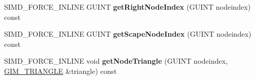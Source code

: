 \begin{DoxyCompactItemize}
\item 
\mbox{\label{classGIM__BOX__TREE__TEMPLATE__SET_ab5c3454c5dd0c971905f9d42ae26cb4b}} 
S\+I\+M\+D\+\_\+\+F\+O\+R\+C\+E\+\_\+\+I\+N\+L\+I\+NE G\+U\+I\+NT {\bfseries get\+Right\+Node\+Index} (G\+U\+I\+NT nodeindex) const
\item 
\mbox{\label{classGIM__BOX__TREE__TEMPLATE__SET_a9f71becbc8d9186689c5bc00293cafbc}} 
S\+I\+M\+D\+\_\+\+F\+O\+R\+C\+E\+\_\+\+I\+N\+L\+I\+NE G\+U\+I\+NT {\bfseries get\+Scape\+Node\+Index} (G\+U\+I\+NT nodeindex) const
\item 
\mbox{\label{classGIM__BOX__TREE__TEMPLATE__SET_a304de6f2f02351f2b361099ec1880827}} 
S\+I\+M\+D\+\_\+\+F\+O\+R\+C\+E\+\_\+\+I\+N\+L\+I\+NE void {\bfseries get\+Node\+Triangle} (G\+U\+I\+NT nodeindex, \hyperlink{classGIM__TRIANGLE}{G\+I\+M\+\_\+\+T\+R\+I\+A\+N\+G\+LE} \&triangle) const
\end{DoxyCompactItemize}

